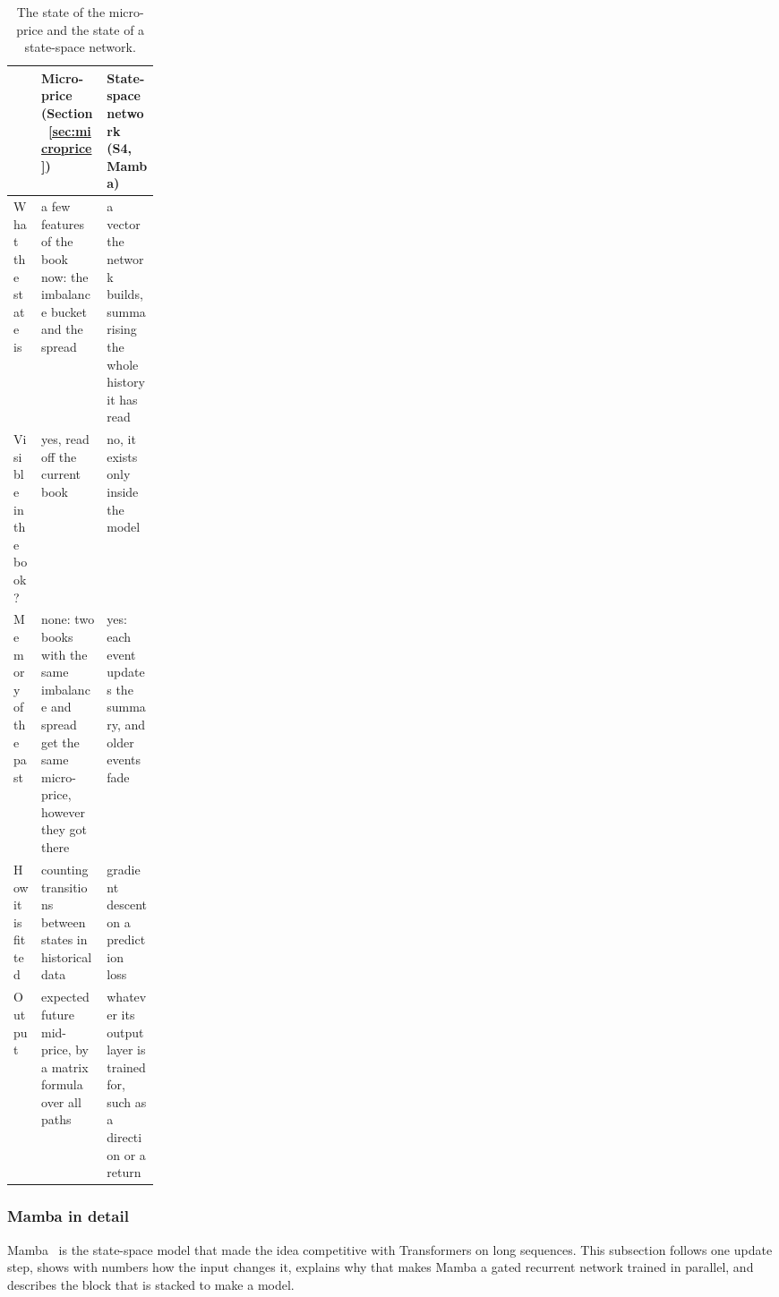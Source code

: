 \begin{table}[!htbp]
\centering\footnotesize
\caption{The state of the micro-price and the state of a state-space network.}
\label{tab:state-kinds}
\setlength{\tabcolsep}{3pt}
\begin{tabularx}{\linewidth}{>{\raggedright\arraybackslash}p{0.19\linewidth}>{\raggedright\arraybackslash}X>{\raggedright\arraybackslash}X}
\toprule
& Micro-price (Section~\ref{sec:microprice}) & State-space network (S4, Mamba) \\
\midrule
What the state is & a few features of the book now: the imbalance bucket and the spread & a vector the network builds, summarising the whole history it has read \\
Visible in the book? & yes, read off the current book & no, it exists only inside the model \\
Memory of the past & none: two books with the same imbalance and spread get the same micro-price, however they got there & yes: each event updates the summary, and older events fade \\
How it is fitted & counting transitions between states in historical data & gradient descent on a prediction loss \\
Output & expected future mid-price, by a matrix formula over all paths & whatever its output layer is trained for, such as a direction or a return \\
\bottomrule
\end{tabularx}
\end{table}

\subsubsection{Mamba in detail}
\label{sec:mamba}

Mamba~\citep{gu2024mamba} is the state-space model that made the idea competitive with Transformers on long
sequences. This subsection follows one update step, shows with numbers how the input changes it, explains why that
makes Mamba a gated recurrent network trained in parallel, and describes the block that is stacked to make a model.

